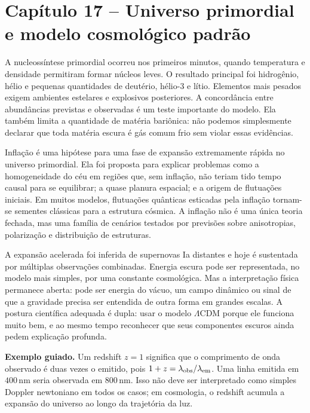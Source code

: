 \documentclass[11pt,a4paper]{article}
\begin{document}
\section*{Capítulo 17 -- Universo primordial e modelo cosmológico padrão}
A nucleossíntese primordial ocorreu nos primeiros minutos, quando temperatura e densidade permitiram formar núcleos leves. O resultado principal foi hidrogênio, hélio e pequenas quantidades de deutério, hélio-3 e lítio. Elementos mais pesados exigem ambientes estelares e explosivos posteriores. A concordância entre abundâncias previstas e observadas é um teste importante do modelo. Ela também limita a quantidade de matéria bariônica: não podemos simplesmente declarar que toda matéria escura é gás comum frio sem violar essas evidências.

Inflação é uma hipótese para uma fase de expansão extremamente rápida no universo primordial. Ela foi proposta para explicar problemas como a homogeneidade do céu em regiões que, sem inflação, não teriam tido tempo causal para se equilibrar; a quase planura espacial; e a origem de flutuações iniciais. Em muitos modelos, flutuações quânticas esticadas pela inflação tornam-se sementes clássicas para a estrutura cósmica. A inflação não é uma única teoria fechada, mas uma família de cenários testados por previsões sobre anisotropias, polarização e distribuição de estruturas.

A expansão acelerada foi inferida de supernovas Ia distantes e hoje é sustentada por múltiplas observações combinadas. Energia escura pode ser representada, no modelo mais simples, por uma constante cosmológica. Mas a interpretação física permanece aberta: pode ser energia do vácuo, um campo dinâmico ou sinal de que a gravidade precisa ser entendida de outra forma em grandes escalas. A postura científica adequada é dupla: usar o modelo $\Lambda$CDM porque ele funciona muito bem, e ao mesmo tempo reconhecer que seus componentes escuros ainda pedem explicação profunda.

\textbf{Exemplo guiado.} Um redshift $z=1$ significa que o comprimento de onda observado é duas vezes o emitido, pois $1+z=\lambda_{\rm obs}/\lambda_{\rm em}$. Uma linha emitida em $400\,\mathrm{nm}$ seria observada em $800\,\mathrm{nm}$. Isso não deve ser interpretado como simples Doppler newtoniano em todos os casos; em cosmologia, o redshift acumula a expansão do universo ao longo da trajetória da luz.
\end{document}
